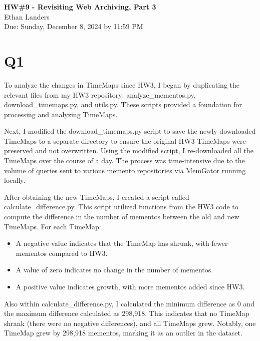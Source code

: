 \documentclass[12pt]{article}
\begin{document}
\begin{centering}
{\large\textbf{HW\#9 - Revisiting Web Archiving, Part 3}}\\ 
Ethan Landers\\
Due: Sunday, December 8, 2024 by 11:59 PM\\
\end{centering}


\section*{Q1}

To analyze the changes in TimeMaps since HW3, I began by duplicating the relevant files from my HW3 repository: analyze\_mementos.py, download\_timemaps.py, and utils.py. These scripts provided a foundation for processing and analyzing TimeMaps. 

Next, I modified the download\_timemaps.py script to save the newly downloaded TimeMaps to a separate directory to ensure the original HW3 TimeMaps were preserved and not overwritten. Using the modified script, I re-downloaded all the TimeMaps over the course of a day. The process was time-intensive due to the volume of queries sent to various memento repositories via MemGator running locally.

After obtaining the new TimeMaps, I created a script called calculate\_difference.py. This script utilized functions from the HW3 code to compute the difference in the number of mementos between the old and new TimeMaps. For each TimeMap:

\begin{itemize}
    \item A negative value indicates that the TimeMap has shrunk, with fewer mementos compared to HW3.
    \item A value of zero indicates no change in the number of mementos.
    \item A positive value indicates growth, with more mementos added since HW3.
\end{itemize}

Also within calculate\_difference.py, I calculated the minimum difference as 0 and the maximum difference calculated as 298,918. This indicates that no TimeMap shrank (there were no negative differences), and all TimeMaps grew. Notably, one TimeMap grew by 298,918 mementos, marking it as an outlier in the dataset.
\end{document}
